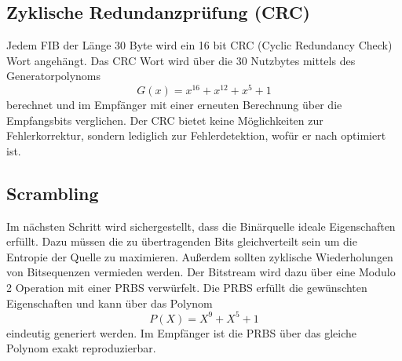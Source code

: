 \subsection{Zyklische Redundanzprüfung (CRC)}
\label{sec:crc}
Jedem \ac{FIB} der Länge 30 Byte wird ein 16 bit CRC (Cyclic Redundancy Check) Wort angehängt. Das CRC Wort wird über die 30 Nutzbytes mittels des Generatorpolynoms
\begin{equation}
G(x) = x^{16} + x^{12} + x^5 + 1
\end{equation}
berechnet und im Empfänger mit einer erneuten Berechnung über die Empfangsbits verglichen. Der CRC bietet keine Möglichkeiten zur Fehlerkorrektur, sondern lediglich zur Fehlerdetektion, wofür er nach \cite{crc:recommendation} optimiert ist.

\subsection{Scrambling}
\label{sec:energieverwischung}
Im nächsten Schritt wird sichergestellt, dass die Binärquelle ideale Eigenschaften erfüllt. Dazu müssen die zu übertragenden Bits gleichverteilt sein um die Entropie der Quelle zu maximieren. Außerdem sollten zyklische Wiederholungen von Bitsequenzen vermieden werden. Der Bitstream wird dazu über eine Modulo 2 Operation mit einer \ac{PRBS} verwürfelt. Die \ac{PRBS} erfüllt die gewünschten Eigenschaften und kann über das Polynom
\begin{equation}
\label{eq:energy_dispersal}
P(X) = X^9 + X^5 + 1
\end{equation}
eindeutig generiert werden. Im Empfänger ist die PRBS über das gleiche Polynom exakt reproduzierbar.

